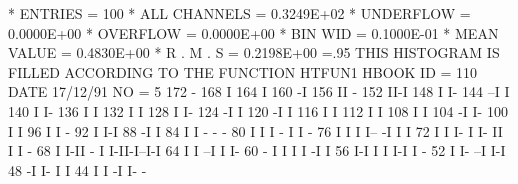 \begin{Listing}
 * ENTRIES =        100      * ALL CHANNELS = 0.3249E+02      * UNDERFLOW = 0.0000E+00      * OVERFLOW = 0.0000E+00
 * BIN WID = 0.1000E-01      * MEAN VALUE   = 0.4830E+00      * R . M . S = 0.2198E+00
\newpage\baselineskip=.95\baselineskip\relax
 THIS HISTOGRAM IS FILLED ACCORDING TO THE FUNCTION HTFUN1                       
 HBOOK     ID =       110                                        DATE  17/12/91              NO =   5
      172                                    -
      168                                    I
      164                                    I
      160                                   -I
      156                                   II -
      152                                   II-I
      148                                   I  I-
      144                                 --I   I
      140                                 I     I-
      136                                 I      I
      132                                 I      I
      128                                 I      I-
      124                                -I       I
      120                               -I        I
      116                               I         I
      112                               I         I
      108                               I         I
      104                              -I         I-
      100                              I           I
       96                              I           I -
       92                              I           I-I
       88                             -I             I
       84                             I              I -                              - -
       80                             I              I I                        -     I I  -
       76                             I              I I                        I--  -I I  I
       72                             I              I I-                       I I- II I  I -
       68                             I              I-II                    -  I  I-II-I--I-I
       64                             I                 I                  --I  I            I-
       60                           - I                 I                  I I -I             I
       56                           I-I                 I                  I I-I              I -
       52                           I                   I-               --I                  I-I
       48                          -I                    I-              I                      I
       44                          I                      I             -I                      I-  -

\end{Listing}
